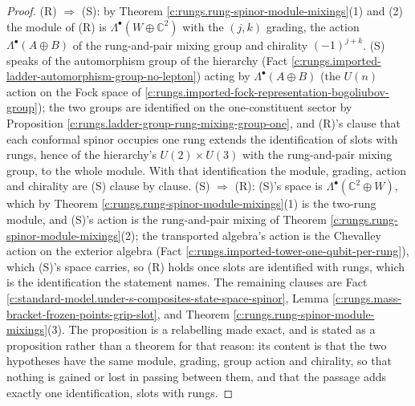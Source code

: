 \documentclass[11pt]{article}
\theoremstyle{definition}
\theoremstyle{plain}
\providecommand{\C}{}\renewcommand{\C}{\mathbb{C}}
\begin{document}
\begin{proof}
(R) $\Rightarrow$ (S): by Theorem \ref{c:rungs.rung-spinor-module-mixings}(1) and (2) the module of (R) is $\Lambda^{\bullet}(W \oplus \C^{2})$ with the $(j,k)$ grading, the action $\Lambda^{\bullet}(A \oplus B)$ of the rung-and-pair mixing group and chirality $(-1)^{j+k}$. (S) speaks of the automorphism group of the hierarchy (Fact \ref{c:rungs.imported-ladder-automorphism-group-no-lepton}) acting by $\Lambda^{\bullet}(A \oplus B)$ (the $U(n)$ action on the Fock space of \ref{c:rungs.imported-fock-representation-bogoliubov-group}); the two groups are identified on the one-constituent sector by Proposition \ref{c:rungs.ladder-group-rung-mixing-group-one}, and (R)'s clause that each conformal spinor occupies one rung extends the identification of slots with rungs, hence of the hierarchy's $U(2) \times U(3)$ with the rung-and-pair mixing group, to the whole module. With that identification the module, grading, action and chirality are (S) clause by clause. (S) $\Rightarrow$ (R): (S)'s space is $\Lambda^{\bullet}(\C^{2} \oplus W)$, which by Theorem \ref{c:rungs.rung-spinor-module-mixings}(1) is the two-rung module, and (S)'s action is the rung-and-pair mixing of Theorem \ref{c:rungs.rung-spinor-module-mixings}(2); the transported algebra's action is the Chevalley action on the exterior algebra (Fact \ref{c:rungs.imported-tower-one-qubit-per-rung}), which (S)'s space carries, so (R) holds once slots are identified with rungs, which is the identification the statement names. The remaining clauses are Fact \ref{c:standard-model.under-s-composites-state-space-spinor}, Lemma \ref{c:rungs.mass-bracket-frozen-points-grip-slot}, and Theorem \ref{c:rungs.rung-spinor-module-mixings}(3). The proposition is a relabelling made exact, and is stated as a proposition rather than a theorem for that reason: its content is that the two hypotheses have the same module, grading, group action and chirality, so that nothing is gained or lost in passing between them, and that the passage adds exactly one identification, slots with rungs.

\end{proof}
\end{document}

